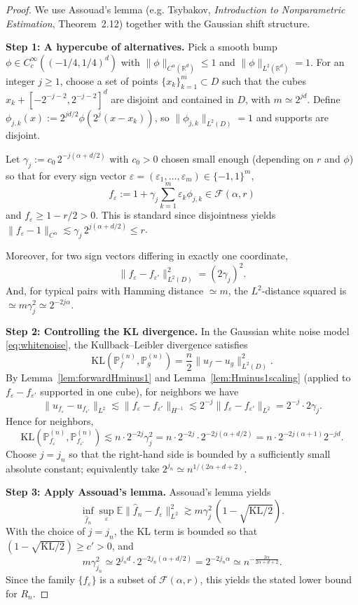 \documentclass[11pt]{article}
\newcommand{\R}{\mathbb{R}}
\newcommand{\D}{D}
\begin{document}
\begin{proof}
We use Assouad's lemma (e.g. Tsybakov, \emph{Introduction to Nonparametric Estimation}, Theorem~2.12) together with the Gaussian shift structure.

\medskip
\noindent\textbf{Step 1: A hypercube of alternatives.}
Pick a smooth bump $\phi\in C^\infty_c((-1/4,1/4)^d)$ with $\|\phi\|_{C^\alpha(\R^d)}\le 1$ and $\|\phi\|_{L^2(\R^d)}=1$.
For an integer $j\ge1$, choose a set of points $\{x_k\}_{k=1}^m\subset \D$ such that the cubes $x_k+[-2^{-j-2},2^{-j-2}]^d$ are disjoint and contained in $\D$, with $m\simeq 2^{jd}$.
Define $\phi_{j,k}(x):=2^{jd/2}\phi(2^j(x-x_k))$, so $\|\phi_{j,k}\|_{L^2(\D)}=1$ and supports are disjoint.

Let $\gamma_j:=c_0\,2^{-j(\alpha+d/2)}$ with $c_0>0$ chosen small enough (depending on $r$ and $\phi$) so that for every sign vector $\varepsilon=(\varepsilon_1,\dots,\varepsilon_m)\in\{-1,1\}^m$,
\[
f_\varepsilon := 1 + \gamma_j \sum_{k=1}^m \varepsilon_k \phi_{j,k}\in \mathcal F(\alpha,r)
\]
and $f_\varepsilon\ge 1-r/2>0$.
This is standard since disjointness yields $\|f_\varepsilon-1\|_{C^\alpha}\lesssim \gamma_j\,2^{j(\alpha+d/2)}\le r$.

Moreover, for two sign vectors differing in exactly one coordinate,
\[
\|f_\varepsilon-f_{\varepsilon'}\|_{L^2(\D)}^2 = (2\gamma_j)^2.
\]
And, for typical pairs with Hamming distance $\simeq m$, the $L^2$-distance squared is $\simeq m\gamma_j^2\simeq 2^{-2j\alpha}$.

\medskip
\noindent\textbf{Step 2: Controlling the KL divergence.}
In the Gaussian white noise model \eqref{eq:whitenoise}, the Kullback--Leibler divergence satisfies
\[
\mathrm{KL}(\mathbb P_{f}^{(n)},\mathbb P_{g}^{(n)})=\frac{n}{2}\|u_f-u_g\|_{L^2(\D)}^2.
\]
By Lemma~\ref{lem:forwardHminus1} and Lemma~\ref{lem:Hminus1scaling} (applied to $f_\varepsilon-f_{\varepsilon'}$ supported in one cube), for neighbors we have
\[
\|u_{f_\varepsilon}-u_{f_{\varepsilon'}}\|_{L^2} \lesssim \|f_\varepsilon-f_{\varepsilon'}\|_{H^{-1}}
\lesssim 2^{-j}\|f_\varepsilon-f_{\varepsilon'}\|_{L^2}
=2^{-j}\cdot 2\gamma_j.
\]
Hence for neighbors,
\[
\mathrm{KL}(\mathbb P^{(n)}_{f_\varepsilon},\mathbb P^{(n)}_{f_{\varepsilon'}})
\lesssim n \cdot 2^{-2j}\gamma_j^2
= n\cdot 2^{-2j}\cdot 2^{-2j(\alpha+d/2)}
= n\cdot 2^{-2j(\alpha+1)}2^{-jd}.
\]
Choose $j=j_n$ so that the right-hand side is bounded by a sufficiently small absolute constant; equivalently take $2^{j_n}\simeq n^{1/(2\alpha+d+2)}$.

\medskip
\noindent\textbf{Step 3: Apply Assouad's lemma.}
Assouad's lemma yields
\[
\inf_{\hat f_n}\sup_{\varepsilon}\mathbb E\| \hat f_n-f_\varepsilon\|_{L^2}^2 \gtrsim m\gamma_j^2\,(1-\sqrt{\mathrm{KL}/2}).
\]
With the choice of $j=j_n$, the KL term is bounded so that $(1-\sqrt{\mathrm{KL}/2})\ge c'>0$, and
\[
m\gamma_{j_n}^2 \simeq 2^{j_nd}\cdot 2^{-2j_n(\alpha+d/2)} = 2^{-2j_n\alpha}
\simeq n^{-\frac{2\alpha}{2\alpha+d+2}}.
\]
Since the family $\{f_\varepsilon\}$ is a subset of $\mathcal F(\alpha,r)$, this yields the stated lower bound for $R_n$.
\end{proof}
\end{document}
